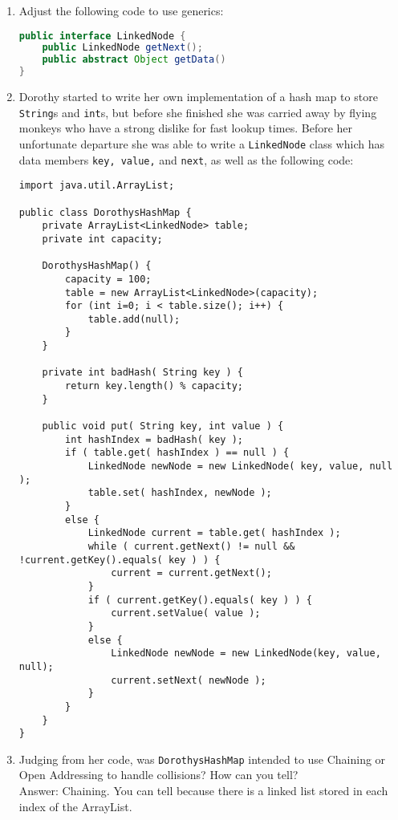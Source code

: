 \documentclass[11pt]{article}
\newenvironment{answer}{\large\lstset{basicstyle=\large\ttfamily}\color{white} \small{Answer:}}{}
\newenvironment{answer}{\large\lstset{basicstyle=\large\ttfamily}\color{red} \small{Answer:}}{}
\begin{document}
\begin{enumerate}
\item Adjust the following code to use generics:
\begin{lstlisting}[language=java]
public interface LinkedNode {
	public LinkedNode getNext();
	public abstract Object getData()
}
\end{lstlisting}


\newpage


\item
Dorothy started to write her own implementation of a hash map to store {\tt String}s and {\tt int}s, but before she finished she was carried away by flying monkeys who have a strong dislike for fast lookup times. Before her unfortunate departure she was able to write a {\tt LinkedNode} class which has data members {\tt key, value,} and {\tt next}, as well as the following code:
\begin{lstlisting}
import java.util.ArrayList;

public class DorothysHashMap {
	private ArrayList<LinkedNode> table;
	private int capacity;
    
	DorothysHashMap() {
		capacity = 100;
		table = new ArrayList<LinkedNode>(capacity);
		for (int i=0; i < table.size(); i++) {
			table.add(null);
		}
	}
    
	private int badHash( String key ) {
		return key.length() % capacity;
	}
    
	public void put( String key, int value ) {
		int hashIndex = badHash( key );
		if ( table.get( hashIndex ) == null ) {
			LinkedNode newNode = new LinkedNode( key, value, null );
			table.set( hashIndex, newNode );
		}
		else {
			LinkedNode current = table.get( hashIndex );
			while ( current.getNext() != null && !current.getKey().equals( key ) ) {
				current = current.getNext();
			}
			if ( current.getKey().equals( key ) ) {
				current.setValue( value );
			}
			else {
				LinkedNode newNode = new LinkedNode(key, value, null);
				current.setNext( newNode );
			}
		}
	}
}
\end{lstlisting}



\item Judging from her code, was {\tt DorothysHashMap} intended to use Chaining or Open Addressing to handle collisions? How can you tell? \\
\begin{answer}
Chaining. You can tell because there is a linked list stored in each index of the ArrayList.
\end{answer}




\end{enumerate}
\end{document}
